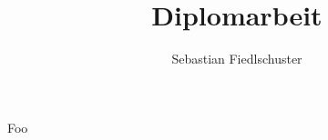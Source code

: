 \documentclass[a4paper]{article}
\title{Diplomarbeit}
\author{Sebastian Fiedlschuster}
\begin{document}
  \maketitle

  
  Foo \cite{mueller2000}
  \printbibliography
\end{document}
